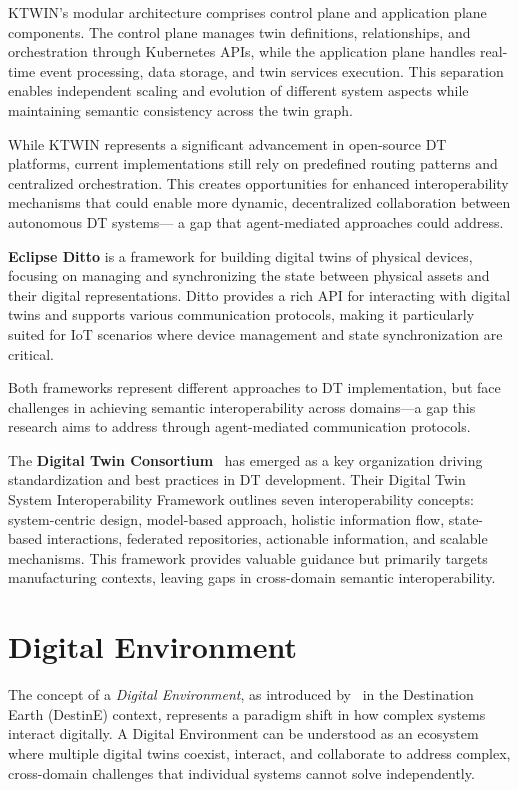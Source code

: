 KTWIN's modular architecture comprises control plane and application plane components.
The control plane manages twin definitions, relationships, and orchestration through Kubernetes APIs,
    while the application plane handles real-time event processing, data storage, and twin services execution.
This separation enables independent scaling and evolution of different system aspects while 
    maintaining semantic consistency across the twin graph.

While KTWIN represents a significant advancement in open-source DT platforms,
    current implementations still rely on predefined routing patterns and centralized orchestration.
This creates opportunities for enhanced interoperability mechanisms that could enable
    more dynamic, decentralized collaboration between autonomous DT systems—
    a gap that agent-mediated approaches could address.

\textbf{Eclipse Ditto} is a framework for building digital twins of physical devices,
    focusing on managing and synchronizing the state between physical assets and their digital representations.
Ditto provides a rich API for interacting with digital twins and supports various communication protocols,
    making it particularly suited for IoT scenarios where device management and state synchronization are critical.

Both frameworks represent different approaches to DT implementation,
    but face challenges in achieving semantic interoperability across domains—a gap 
    this research aims to address through agent-mediated communication protocols.

The \textbf{Digital Twin Consortium}~\cite{Budiardjo_2021}
    has emerged as a key organization driving standardization and best practices in DT development.
Their Digital Twin System Interoperability Framework outlines seven interoperability concepts:
    system-centric design,
    model-based approach,
    holistic information flow,
    state-based interactions,
    federated repositories,
    actionable information, and
    scalable mechanisms.
This framework provides valuable guidance but primarily targets manufacturing contexts,
    leaving gaps in cross-domain semantic interoperability.

\section{Digital Environment}

The concept of a \emph{Digital Environment}, as introduced by~\cite{Nativi_2021} in the Destination Earth (DestinE) context, represents
    a paradigm shift in how complex systems interact digitally.
A Digital Environment can be understood as an ecosystem where multiple digital twins coexist, interact, and collaborate 
    to address complex, cross-domain challenges that individual systems cannot solve independently.


